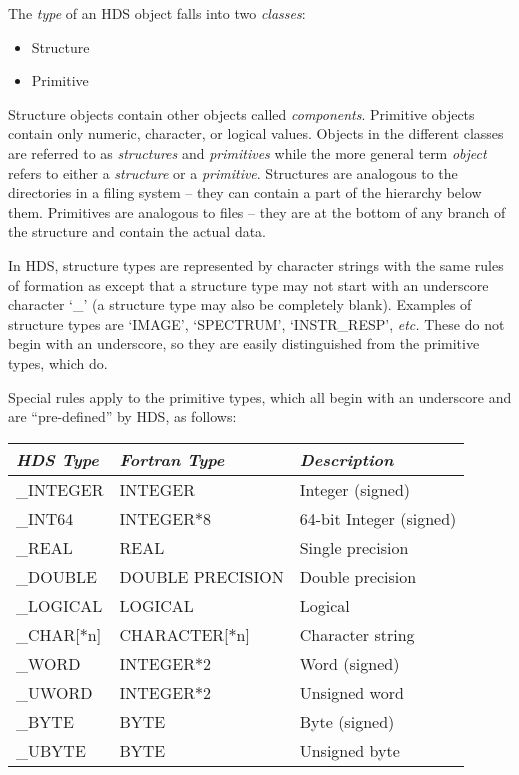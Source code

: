 \documentclass[twoside,11pt]{starlink}
\providecommand{\qt}[1]{``#1''}
\providecommand{\st}[1]{{\emph{#1}}}
\providecommand{\astar}[0]{{$*$}}
\begin{document}
The \st{type} of an HDS object falls into two \st{classes}:

\begin{itemize}
\item Structure
\item Primitive
\end{itemize}

Structure objects contain other objects called
\st{components}. Primitive objects contain only numeric, character, or
logical values. Objects in the different classes are referred to as
\st{structures} and \st{primitives} while the more general term
\st{object} refers to either a \st{structure} or a
\st{primitive}. Structures are analogous to the directories in a
filing system -- they can contain a part of the hierarchy below
them. Primitives are analogous to files -- they are at the bottom of
any branch of the structure and contain the actual data.

In HDS, structure types are represented by character strings with the
same rules of formation as \htmlref{\st{name,}}{sect:name} except that
a structure type may not start with an underscore character `\_' (a
structure type may also be completely blank). Examples of structure
types are `IMAGE', `SPECTRUM', `INSTR\_RESP', \st{etc.} These do not
begin with an underscore, so they are easily distinguished from the
primitive types, which do.

Special rules apply to the primitive types, which all begin with an
underscore and are \qt{pre-defined} by HDS, as follows:

\begin{center}
\begin{tabular}{|l|l|l|}
\hline
\st{HDS Type} & \st{Fortran Type} & \st{Description}\\
\hline \hline
\_INTEGER & INTEGER & Integer (signed)\\
\_INT64 & INTEGER{\astar}8 & 64-bit Integer (signed)\\
\_REAL & REAL & Single precision\\
\_DOUBLE & DOUBLE PRECISION & Double precision\\
\_LOGICAL & LOGICAL & Logical\\
\_CHAR[{\astar}n] & CHARACTER[{\astar}n] & Character string\\
\hline
\_WORD & INTEGER{\astar}2 & Word (signed)\\
\_UWORD & INTEGER{\astar}2 & Unsigned word\\
\_BYTE & BYTE & Byte (signed)\\
\_UBYTE & BYTE & Unsigned byte\\
\hline
\end{tabular}
\end{center}
\end{document}

